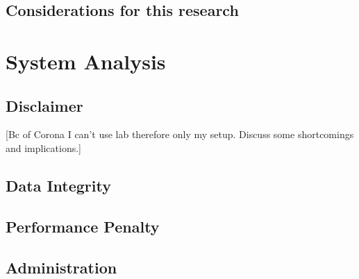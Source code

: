 \documentclass[titlepage, a4paper, 11pt]{scrartcl}
\begin{document}

        \subsection{Considerations for this research}

    \section{System Analysis}


        \subsection{Disclaimer}

        [Bc of Corona I can't use lab therefore only my setup. Discuss some shortcomings and implications.]



        \subsection{Data Integrity}



        \subsection{Performance Penalty}\label{analysis:penalty}



        \subsection{Administration}\label{analysis:administration}
\end{document}
